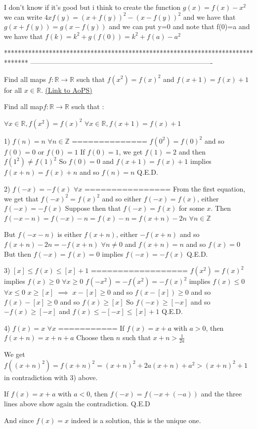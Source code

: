 \begin{solution}
	I don't know if it's good but i think to create the function $g(x)=f(x)-x^2$ we can write $4xf(y)=(x+f(y))^2-(x-f(y))^2$ and we have that $g(x+f(y))=g(x-f(y)) $ and we can put y=0 and note that f(0)=a and we have that $f(k)=k^2+g(f(0))=k^2+f(a)-a^2$
\end{solution}
*******************************************************************************
-------------------------------------------------------------------------------

\begin{problem}
	Find all maps $ f : \mathbb{R} \to \mathbb{R}$ such that $f(x^2)=f(x)^2$ and $f(x+1)=f(x)+1$ for all $x \in \mathbb{R}$.
	\flushright \href{https://artofproblemsolving.com/community/c6h386824}{(Link to AoPS)}
\end{problem}



\begin{solution}
	\begin{tcolorbox}Find all map$ f : \mathbb{R} \to \mathbb{R}$ such that :

$\forall x \in \mathbb{R}, f(x^2)=f(x)^2$
$\forall x \in \mathbb{R}, f(x+1)=f(x)+1 $\end{tcolorbox}
1) $f(n)=n$ $\forall n\in\mathbb Z$
==============
$f(0^2)=f(0)^2$ and so $f(0)=0$ or $f(0)=1$
If $f(0)=1$, we get $f(1)=2$ and then $f(1^2)\ne f(1)^2$
So $f(0)=0$ and $f(x+1)=f(x)+1$ implies $f(x+n)=f(x)+n$ and so $f(n)=n$
Q.E.D.

2) $f(-x)=-f(x)$ $\forall x$
================
From the first equation, we get that $f(-x)^2=f(x)^2$ and so either $f(-x)=f(x)$, either $f(-x)=-f(x)$
Suppose then that $f(-x)=f(x)$ for some $x$.
Then $f(-x-n)=f(-x)-n=f(x)-n=f(x+n)-2n$ $\forall n\in\mathbb Z$

But $f(-x-n)$ is either $f(x+n)$, either $-f(x+n)$ and so $f(x+n)-2n=-f(x+n)$ $\forall n\ne 0$ and $f(x+n)=n$ and so $f(x)=0$
But then $f(-x)=f(x)=0$ implies $f(-x)=-f(x)$
Q.E.D.

3) $[x]\le f(x)\le [x]+1$
==================
$f(x^2)=f(x)^2$ implies $f(x)\ge 0$ $\forall x\ge 0$
$f(-x^2)=-f(x^2)=-f(x)^2$ implies $f(x)\le 0$ $\forall x\le 0$
$x\ge [x]$ $\implies$ $x-[x]\ge 0$ and so $f(x-[x])\ge 0$ and so $f(x)-[x]\ge 0$ and so $f(x)\ge [x]$
So $f(-x)\ge[-x]$ and so $-f(x)\ge[-x]$ and $f(x)\le -[-x]\le[x]+1$
Q.E.D.

4) $f(x)=x$ $\forall x$
===========
If $f(x)=x+a$ with $a>0$, then $f(x+n)=x+n+a$
Choose then $n$ such that $x+n>\frac 1{2a}$

We get $f((x+n)^2)=f(x+n)^2=(x+n)^2+2a(x+n)+a^2>(x+n)^2+1$ in contradiction with 3) above.

If $f(x)=x+a$ with $a<0$, then $f(-x)=f(-x+(-a))$ and the three lines above show again the contradiction.
Q.E.D

And since $\boxed{f(x)=x}$ indeed is a solution, this is the unique one.
\end{solution}



